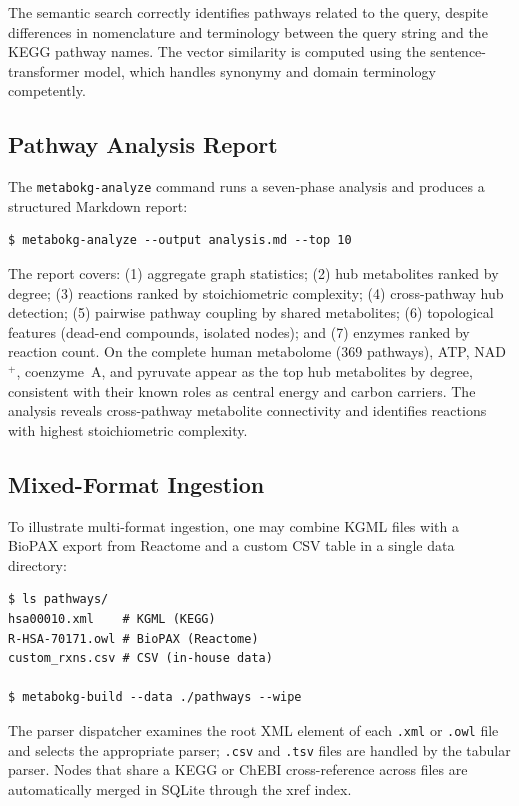 \documentclass[10pt]{article}
\begin{document}
The semantic search correctly identifies pathways related to the query,
despite differences in nomenclature and terminology between the query string
and the KEGG pathway names. The vector similarity is computed using the
sentence-transformer model, which handles synonymy and domain terminology
competently.

\subsection{Pathway Analysis Report}

The \texttt{metabokg-analyze} command runs a seven-phase analysis and produces
a structured Markdown report:

\begin{lstlisting}[style=bash]
$ metabokg-analyze --output analysis.md --top 10
\end{lstlisting}

The report covers: (1) aggregate graph statistics; (2) hub metabolites ranked
by degree; (3) reactions ranked by stoichiometric complexity; (4)
cross-pathway hub detection; (5) pairwise pathway coupling by shared
metabolites; (6) topological features (dead-end compounds, isolated nodes);
and (7) enzymes ranked by reaction count. On the complete human metabolome
(369 pathways), ATP, NAD$^{+}$, coenzyme~A, and pyruvate appear as the top hub
metabolites by degree, consistent with their known roles as central energy and
carbon carriers. The analysis reveals cross-pathway metabolite connectivity and
identifies reactions with highest stoichiometric complexity.

\subsection{Mixed-Format Ingestion}

To illustrate multi-format ingestion, one may combine KGML files with a
BioPAX export from Reactome and a custom CSV table in a single data directory:

\begin{lstlisting}[style=bash]
$ ls pathways/
hsa00010.xml    # KGML (KEGG)
R-HSA-70171.owl # BioPAX (Reactome)
custom_rxns.csv # CSV (in-house data)

$ metabokg-build --data ./pathways --wipe
\end{lstlisting}

The parser dispatcher examines the root XML element of each \texttt{.xml} or
\texttt{.owl} file and selects the appropriate parser; \texttt{.csv} and
\texttt{.tsv} files are handled by the tabular parser. Nodes that share a
KEGG or ChEBI cross-reference across files are automatically merged in SQLite
through the xref index.
\end{document}
